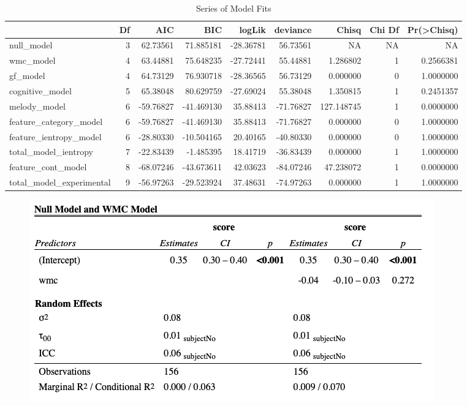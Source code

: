 \documentclass[12pt,]{book}
\begin{document}
\begin{table}[t]

\caption{\label{tab:modeltable}Series of Model Fits}
\centering
\begin{tabular}{lrrrrrrrr}
\toprule
  & Df & AIC & BIC & logLik & deviance & Chisq & Chi Df & Pr(>Chisq)\\
\midrule
null\_model & 3 & 62.73561 & 71.885181 & -28.36781 & 56.73561 & NA & NA & NA\\
wmc\_model & 4 & 63.44881 & 75.648235 & -27.72441 & 55.44881 & 1.286802 & 1 & 0.2566381\\
gf\_model & 4 & 64.73129 & 76.930718 & -28.36565 & 56.73129 & 0.000000 & 0 & 1.0000000\\
cognitive\_model & 5 & 65.38048 & 80.629759 & -27.69024 & 55.38048 & 1.350815 & 1 & 0.2451357\\
melody\_model & 6 & -59.76827 & -41.469130 & 35.88413 & -71.76827 & 127.148745 & 1 & 0.0000000\\
\addlinespace
feature\_category\_model & 6 & -59.76827 & -41.469130 & 35.88413 & -71.76827 & 0.000000 & 0 & 1.0000000\\
feature\_ientropy\_model & 6 & -28.80330 & -10.504165 & 20.40165 & -40.80330 & 0.000000 & 0 & 1.0000000\\
total\_model\_ientropy & 7 & -22.83439 & -1.485395 & 18.41719 & -36.83439 & 0.000000 & 1 & 1.0000000\\
feature\_cont\_model & 8 & -68.07246 & -43.673611 & 42.03623 & -84.07246 & 47.238072 & 1 & 0.0000000\\
total\_model\_experimental & 9 & -56.97263 & -29.523924 & 37.48631 & -74.97263 & 0.000000 & 1 & 1.0000000\\
\bottomrule
\end{tabular}
\end{table}

\begin{figure}

{\centering \includegraphics[width=1\linewidth]{img/metable1} 

}

\end{figure}
\end{document}
